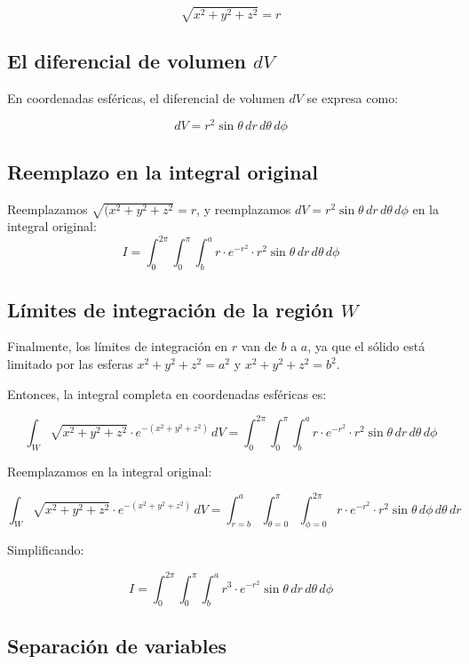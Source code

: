 \[
\sqrt{x^2 + y^2 + z^2} = r
\]

\subsection*{El diferencial de volumen \(dV\)}

En coordenadas esféricas, el diferencial de volumen \(dV\) se expresa como:

\[
dV = r^2 \sin\theta \, dr \, d\theta \, d\phi
\]

\subsection*{Reemplazo en la integral original}

Reemplazamos \(\sqrt{(x^2 + y^2 + z^2} = r\), y reemplazamos \(dV = r^2 \sin\theta \, dr \, d\theta \, d\phi\) en la integral original:
   \[
   I = \int_{0}^{2\pi} \int_{0}^{\pi} \int_{b}^{a} r \cdot e^{-r^2} \cdot r^2 \sin\theta \, dr \, d\theta \, d\phi
   \]
\subsection*{Límites de integración de la región \(W\)}

Finalmente, los límites de integración en \(r\) van de \(b\) a \(a\), ya que el sólido está limitado por las esferas \(x^2 + y^2 + z^2 = a^2\) y \(x^2 + y^2 + z^2 = b^2\).

Entonces, la integral completa en coordenadas esféricas es:

   \[
   \int_{W} \sqrt{x^2 + y^2 + z^2} \cdot e^{-(x^2 + y^2 + z^2)} \, dV = \int_{0}^{2\pi} \int_{0}^{\pi} \int_{b}^{a} r \cdot e^{-r^2} \cdot r^2 \sin\theta \, dr \, d\theta \, d\phi
   \]

Reemplazamos en la integral original:

\[
\int_W \sqrt{x^2 + y^2 + z^2} \cdot e^{-(x^2 + y^2 + z^2)} \, dV = \int_{r=b}^{a} \int_{\theta=0}^{\pi} \int_{\phi=0}^{2\pi} r \cdot e^{-r^2} \cdot r^2 \sin\theta \, d\phi \, d\theta \, dr
\]

Simplificando:

\[
I = \int_{0}^{2\pi} \int_{0}^{\pi} \int_{b}^{a} r^3 \cdot e^{-r^2} \sin\theta \, dr \, d\theta \, d\phi
\]

\subsection*{Separación de variables}

